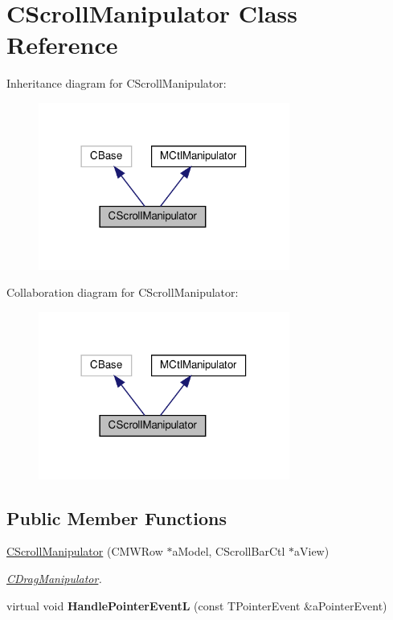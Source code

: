 \hypertarget{classCScrollManipulator}{}\section{C\+Scroll\+Manipulator Class Reference}
\label{classCScrollManipulator}


Inheritance diagram for C\+Scroll\+Manipulator\+:
\nopagebreak
\begin{figure}[H]
\begin{center}
\leavevmode
\includegraphics[width=234pt]{classCScrollManipulator__inherit__graph}
\end{center}
\end{figure}


Collaboration diagram for C\+Scroll\+Manipulator\+:
\nopagebreak
\begin{figure}[H]
\begin{center}
\leavevmode
\includegraphics[width=234pt]{classCScrollManipulator__coll__graph}
\end{center}
\end{figure}
\subsection*{Public Member Functions}
\begin{DoxyCompactItemize}
\item 
\hyperlink{classCScrollManipulator_a4ec182540b21abb51ccbfc8fbb04b1fe}{C\+Scroll\+Manipulator} (C\+M\+W\+Row $\ast$a\+Model, C\+Scroll\+Bar\+Ctl $\ast$a\+View)
\begin{DoxyCompactList}\small\item\em \hyperlink{classCDragManipulator}{C\+Drag\+Manipulator}. \end{DoxyCompactList}\item 
\mbox{\label{classCScrollManipulator_a7bc1704fdc5c07ecaf76205cfaecb413}} 
virtual void {\bfseries Handle\+Pointer\+EventL} (const T\+Pointer\+Event \&a\+Pointer\+Event)
\end{DoxyCompactItemize}
